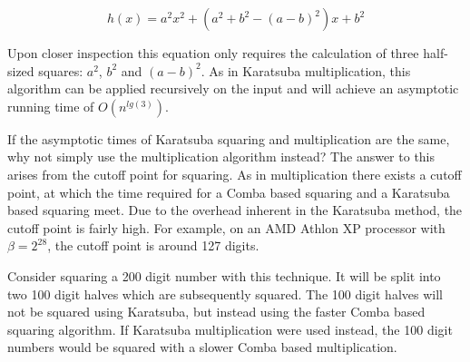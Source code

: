 \documentclass[b5paper]{book}
\begin{document}
\begin{equation}
h(x) = a^2x^2 + \left (a^2 + b^2 - (a - b)^2 \right )x + b^2
\end{equation}

Upon closer inspection this equation only requires the calculation of three half-sized squares: $a^2$, $b^2$ and $(a - b)^2$.  As in 
Karatsuba multiplication, this algorithm can be applied recursively on the input and will achieve an asymptotic running time of 
$O \left ( n^{lg(3)} \right )$.

If the asymptotic times of Karatsuba squaring and multiplication are the same, why not simply use the multiplication algorithm 
instead?  The answer to this arises from the cutoff point for squaring.  As in multiplication there exists a cutoff point, at which the 
time required for a Comba based squaring and a Karatsuba based squaring meet.  Due to the overhead inherent in the Karatsuba method, the cutoff 
point is fairly high.  For example, on an AMD Athlon XP processor with $\beta = 2^{28}$, the cutoff point is around 127 digits.  

Consider squaring a 200 digit number with this technique.  It will be split into two 100 digit halves which are subsequently squared.  
The 100 digit halves will not be squared using Karatsuba, but instead using the faster Comba based squaring algorithm.  If Karatsuba multiplication
were used instead, the 100 digit numbers would be squared with a slower Comba based multiplication.  
\end{document}
